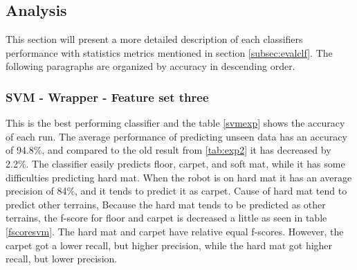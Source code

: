 \documentclass[USenglish]{ifimaster}  %
\begin{document}
\subsection{Analysis}
This section will present a more detailed description of each classifiers performance with statistics metrics mentioned in section \ref{subsec:evalclf}. The following paragraphs are organized by accuracy in descending order.
\newpage

\subsubsection{SVM - Wrapper - Feature set three}
This is the best performing classifier and the table \ref{svmexp} shows the accuracy of each run. The average performance of predicting unseen data has an accuracy of 94.8\%, and compared to the old result from \ref{tab:exp2} it has decreased by 2.2\%. The classifier easily predicts floor, carpet, and soft mat, while it has some difficulties predicting hard mat. When the robot is on hard mat it has an average precision of 84\%, and it tends to predict it as carpet. Cause of hard mat tend to predict other terrains, Because the hard mat tends to be predicted as other terrains, the f-score for floor and carpet is decreased a little as seen in table \ref{fscoresvm}. The hard mat and carpet have relative equal f-scores. However, the carpet got a lower recall, but higher precision, while the hard mat got higher recall, but lower precision.
\end{document}

